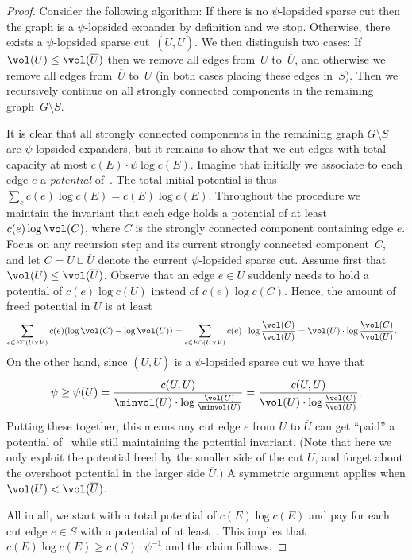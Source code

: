 \lemLexpDecomp*

\begin{proof}
Consider the following algorithm: If there is no $\psi$-lopsided sparse cut then the graph is a $\psi$-lopsided expander by definition and we stop. Otherwise, there exists a $\psi$-lopsided sparse cut~$(U, \overline U)$. We then distinguish two cases: If $\vol(U) \leq \vol(\overline U)$ then we remove all edges from~$U$ to~$\overline U$, and otherwise we remove all edges from~$\overline U$ to~$U$ (in both cases placing these edges in~$S$). Then we recursively continue on all strongly connected components in the remaining graph~$G \setminus S$. 

It is clear that all strongly connected components in the remaining graph $G \setminus S$ are $\psi$-lopsided expanders, but it remains to show that we cut edges with total capacity at most $c(E) \cdot \psi \log c(E)$. Imagine that initially we associate to each edge $e$ a \emph{potential} of~. The total initial potential is thus $\sum_e c(e) \log c(E) = c(E) \log c(E)$. Throughout the procedure we maintain the invariant that each edge holds a potential of at least $c(e) \log \vol(C)$, where $C$ is the strongly connected component containing edge $e$. Focus on any recursion step and its current strongly connected component~$C$, and let $C = U \sqcup \overline U$ denote the current $\psi$-lopsided sparse cut. Assume first that $\vol(U) \leq \vol(\overline U)$. Observe that an edge $e \in U$ suddenly needs to hold a potential of $c(e)\log c(U)$ instead of $c(e)\log c(C)$. Hence, the amount of freed potential in $U$ is at least
\begin{align*}
	\sum_{e \in E \cap (U \times V)} c(e) (\log \vol(C) - \log \vol(U)) &=
	\sum_{e \in E \cap (U \times V)} c(e)  \cdot \log \frac{\vol(C)}{\vol(U)} = \vol(U) \cdot \log \frac{\vol(C)}{\vol(U)}.
\end{align*}
On the other hand, since $(U, \overline U)$ is a $\psi$-lopsided sparse cut we have that
\begin{equation*}
	\psi \geq \psi(U) = \frac{c(U, \overline U)}{\minvol(U) \cdot \log \frac{\vol(C)}{\minvol(U)}} = \frac{c(U, \overline U)}{\vol(U) \cdot \log \frac{\vol(C)}{\vol(U)}}.
\end{equation*}
Putting these together, this means any cut edge $e$ from $U$ to $\overline U$ can get ``paid'' a potential of~ while still maintaining the potential invariant. (Note that here we only exploit the potential freed by the smaller side of the cut $U$, and forget about the overshoot potential in the larger side $\overline U$.) A symmetric argument applies when $\vol(U) < \vol(\overline U)$.

All in all, we start with a total potential of $c(E) \log c(E)$ and pay for each cut edge $e \in S$ with a potential of at least~. This implies that $c(E) \log c(E) \geq c(S) \cdot \psi^{-1}$ and the claim follows.
\end{proof}

